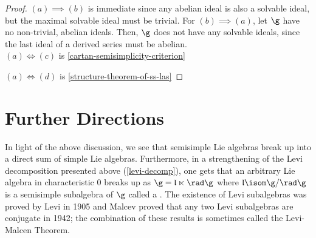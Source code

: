\documentclass[11pt,leqno,oneside]{amsart}
\numberwithin{thm}{section}
\begin{document}
\begin{proof}
  \((a) \implies (b)\) is immediate since any abelian ideal is also a
  solvable ideal, but the maximal solvable ideal must be trivial. For
  \((b) \implies (a)\), let \(\g\) have no non-trivial, abelian
  ideals. Then, \(\g\) does not have any solvable ideals, since the
  last ideal of a derived series must be abelian. \\

  \((a) \iff (c)\) is \ref{cartan-semisimplicity-criterion}

  \((a) \iff (d)\) is \ref{structure-theorem-of-ss-las}
\end{proof}
\section{Further Directions}
In light of the above discussion, we see that semisimple Lie algebras
break up into a direct sum of simple Lie algebras. Furthermore, in a
strengthening of the Levi decomposition presented above
(\ref{levi-decomp}), one gets that an arbitrary Lie algebra in
characteristic \(0\) breaks up as \(\g =
\mathfrak{l} \ltimes \rad \g\) where
\(\mathfrak{l} \isom \g/\rad \g\) 
is a semisimple subalgebra of \(\g\) called a . The existence of Levi subalgebras was proved by Levi in
1905 and Malcev proved that any two Levi subalgebras are conjugate in
1942; the combination of these results is sometimes called the
Levi-Malcen Theorem. 
\end{document}
